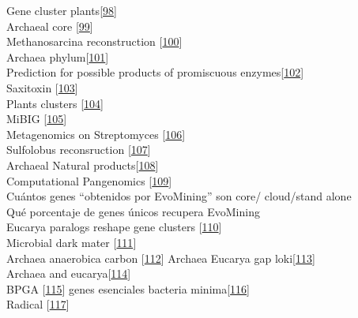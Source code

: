 \documentclass[12pt,twoside]{reedthesis}
\begin{document}
  Gene cluster plants{[}\protect\hyperlink{ref-osbourn_gene_2010}{98}{]}\\
  Archaeal core
  {[}\protect\hyperlink{ref-makarova_comparative_1999}{99}{]}\\
  Methanosarcina reconstruction
  {[}\protect\hyperlink{ref-benedict_genome-scale_2012}{100}{]}\\
  Archaea phylum{[}\protect\hyperlink{ref-seitz_genomic_2016}{101}{]}\\
  Prediction for possible products of promiscuous
  enzymes{[}\protect\hyperlink{ref-jeffryes_mines_2015}{102}{]}\\
  Saxitoxin {[}\protect\hyperlink{ref-moustafa_origin_2009}{103}{]}\\
  Plants clusters
  {[}\protect\hyperlink{ref-medema_computational_2016}{104}{]}\\
  MiBIG {[}\protect\hyperlink{ref-medema_minimum_2015}{105}{]}\\
  Metagenomics on Streptomyces
  {[}\protect\hyperlink{ref-iqbal_natural_2016}{106}{]}\\
  Sulfolobus reconsruction
  {[}\protect\hyperlink{ref-ulas_genome-scale_2012}{107}{]}\\
  Archaeal Natural
  products{[}\protect\hyperlink{ref-charlesworth_untapped_2015}{108}{]}\\
  Computational Pangenomics
  {[}\protect\hyperlink{ref-computational_pan-genomics_consortium_computational_2016}{109}{]}\\
  Cuántos genes ``obtenidos por EvoMining'' son core/ cloud/stand alone\\
  Qué porcentaje de genes únicos recupera EvoMining\\
  Eucarya paralogs reshape gene clusters
  {[}\protect\hyperlink{ref-chan_remodelling_2015}{110}{]}\\
  Microbial dark mater
  {[}\protect\hyperlink{ref-rinke_insights_2013}{111}{]}\\
  Archaea anaerobica carbon
  {[}\protect\hyperlink{ref-castelle_genomic_2015}{112}{]} Archaea Eucarya
  gap loki{[}\protect\hyperlink{ref-spang_complex_2015}{113}{]}\\
  Archaea and
  eucarya{[}\protect\hyperlink{ref-koonin_archaeal_2015}{114}{]}\\
  BPGA {[}\protect\hyperlink{ref-chaudhari_bpga-_2016}{115}{]} genes
  esenciales bacteria
  minima{[}\protect\hyperlink{ref-glass_essential_2006}{116}{]}\\
  Radical {[}\protect\hyperlink{ref-narechania_random_2012}{117}{]}\\
\end{document}
